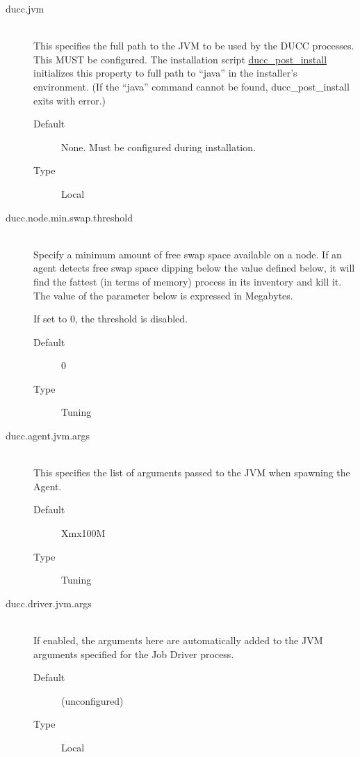 \begin{description}
       \item[ducc.jvm] \hfill \\
         This specifies the full path to the JVM to be used by the DUCC processes. This MUST be
         configured.  The installation script
         \hyperref[subsec:install.single-user]{ducc\_post\_install} initializes this property to 
         full path to ``java'' in the installer's environment.  (If the ``java'' command cannot
         be found, ducc\_post\_install exits with error.)
         \begin{description}
           \item[Default] None.  Must be configured during installation.
           \item[Type] Local 
         \end{description}

       \item[ducc.node.min.swap.threshold] \hfill \\
         Specify a minimum amount of free swap space available on a node.
         If an agent detects free swap space dipping below the value defined
         below, it will find the fattest (in terms of memory) process in its
         inventory and kill it. The value of the parameter below is expressed
         in Megabytes.

         If set to 0, the threshold is disabled.
         \begin{description}
           \item[Default] 0
           \item[Type] Tuning
         \end{description}


       \item[ducc.agent.jvm.args] \hfill \\
         This specifies the list of arguments passed to the JVM when spawning the Agent. 
         \begin{description}           
           \item[Default] Xmx100M 
           \item[Type] Tuning 
         \end{description}


       \item[ducc.driver.jvm.args] \hfill \\
         If enabled, the arguments here are automatically added to the JVM arguments specified for 
         the Job Driver process. 
         \begin{description}
           \item[Default] (unconfigured) 
           \item[Type] Local 
         \end{description}


\end{description}
